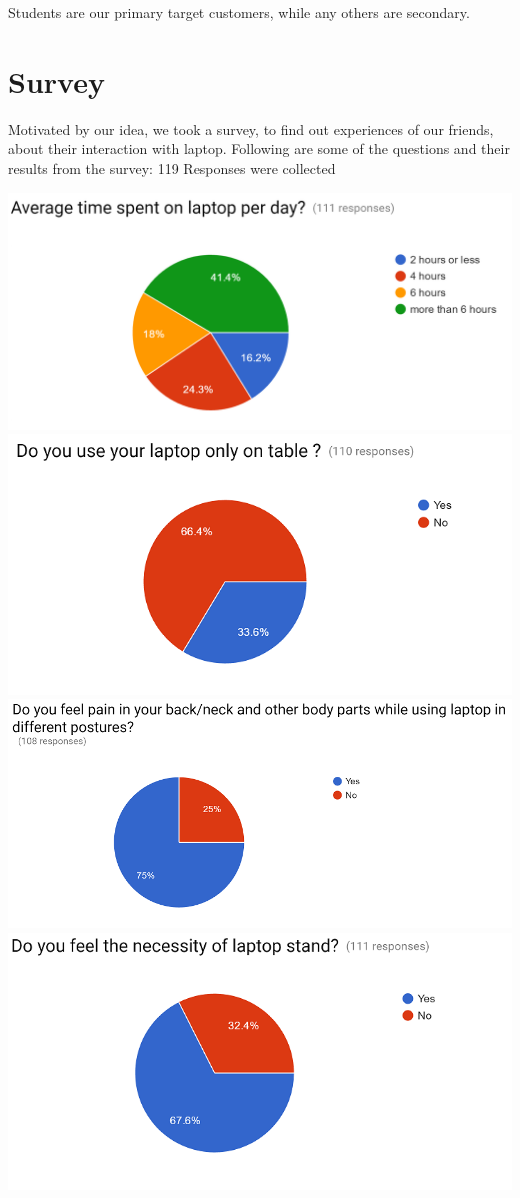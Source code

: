 Students are our primary target customers, while any others are secondary. 

\section{Survey}

Motivated by our idea, we took a survey, to find out experiences of our friends, about their interaction with laptop. Following are some of the questions and their results from the survey:
119 Responses were collected

\includegraphics[scale=0.5]{sur1}
\newpage
\includegraphics[width=\linewidth]{sur2}
\includegraphics[width=\linewidth]{sur3}
\includegraphics[width=\linewidth]{sur4}
